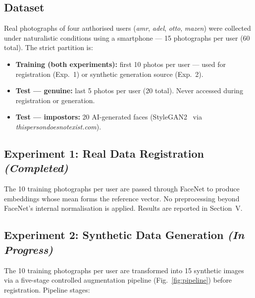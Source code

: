\documentclass[conference]{IEEEtran}
\begin{document}
\subsection{Dataset}

Real photographs of four authorised users (\textit{amr}, \textit{adel}, \textit{otto}, \textit{mazen}) were collected under naturalistic conditions using a smartphone — 15 photographs per user (60 total). The strict partition is:
\begin{itemize}
    \item \textbf{Training (both experiments):} first 10 photos per user — used for registration (Exp.~1) or synthetic generation source (Exp.~2).
    \item \textbf{Test — genuine:} last 5 photos per user (20 total). Never accessed during registration or generation.
    \item \textbf{Test — impostors:} 20 AI-generated faces (StyleGAN2~\cite{karras2020stylegan2} via \textit{thispersondoesnotexist.com}).
\end{itemize}

\subsection{Experiment 1: Real Data Registration \textit{(Completed)}}

The 10 training photographs per user are passed through FaceNet to produce embeddings whose mean forms the reference vector. No preprocessing beyond FaceNet's internal normalisation is applied. Results are reported in Section~V.

\subsection{Experiment 2: Synthetic Data Generation \textit{(In Progress)}}

The 10 training photographs per user are transformed into 15 synthetic images via a five-stage controlled augmentation pipeline (Fig.~\ref{fig:pipeline}) before registration. Pipeline stages:
\end{document}
